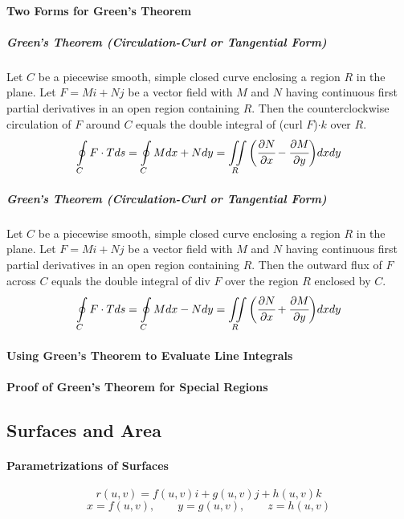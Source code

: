 \documentclass{article}
\begin{document}
            \paragraph{Two Forms for Green's Theorem}
                \subparagraph{Green's Theorem (Circulation-Curl or Tangential Form)} Let $C$ be a piecewise smooth, simple closed curve enclosing a region $R$ in the plane. Let $F=Mi+Nj$ be a vector field with $M$ and $N$ having continuous first partial derivatives in an open region containing $R$. Then the counterclockwise circulation of $F$ around $C$ equals the double integral of (curl $F$)$\cdot k$ over $R$.
                \[\oint\limits_CF\cdot Tds=\oint\limits_CMdx+Ndy=\iint\limits_R\bigg(\cfrac{\partial N}{\partial x}-\cfrac{\partial M}{\partial y}\bigg)dxdy\]
                \subparagraph{Green's Theorem (Circulation-Curl or Tangential Form)} Let $C$ be a piecewise smooth, simple closed curve enclosing a region $R$ in the plane. Let $F=Mi+Nj$ be a vector field with $M$ and $N$ having continuous first partial derivatives in an open region containing $R$. Then the outward flux of $F$ across $C$ equals the double integral of div $F$ over the region $R$ enclosed by $C$.
                \[\oint\limits_CF\cdot Tds=\oint\limits_CMdx-Ndy=\iint\limits_R\bigg(\cfrac{\partial N}{\partial x}+\cfrac{\partial M}{\partial y}\bigg)dxdy\]
            \paragraph{Using Green's Theorem to Evaluate Line Integrals}
            \paragraph{Proof of Green's Theorem for Special Regions}
        \subsection{Surfaces and Area}
            \paragraph{Parametrizations of Surfaces}
                \[r(u,v)=f(u,v)i+g(u,v)j+h(u,v)k\]
                \[x=f(u,v),\qquad y=g(u,v),\qquad z=h(u,v)\]
\end{document}
